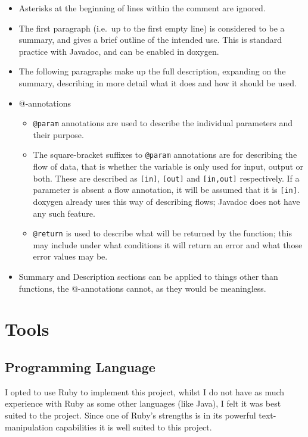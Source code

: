 \begin{itemize}
  \item Asterisks at the beginning of lines within the comment are ignored.
  \item The first paragraph (i.e.~up to the first empty line) is considered to
    be a summary, and gives a brief outline of the intended use. This is
    standard practice with Javadoc, and can be enabled in doxygen.
  \item The following paragraphs make up the full description, expanding on the
    summary, describing in more detail what it does and how it should be used.
  \item @-annotations
    \begin{itemize}
      \item \lstinline|@param| annotations are used to describe the individual
        parameters and their purpose.
      \item The square-bracket suffixes to \lstinline|@param| annotations are
        for describing the flow of data, that is whether the variable is only
        used for input, output or both. These are described as \lstinline|[in]|,
        \lstinline|[out]| and \lstinline|[in,out]| respectively. If a parameter
        is absent a flow annotation, it will be assumed that it is
        \lstinline|[in]|.
        doxygen already uses this way of describing flows; Javadoc does not have
        any such feature.
      \item \lstinline|@return| is used to describe what will be returned by the
        function; this may include under what conditions it will return an error
        and what those error values may be.
    \end{itemize}
    \item Summary and Description sections can be applied to things other than
      functions, the @-annotations cannot, as they would be meaningless.
\end{itemize}

\section{Tools}
  \subsection{Programming Language}
    I opted to use Ruby to implement this project, whilst I do not have as much
    experience with Ruby as some other languages (like Java), I felt it was best
    suited to the project. Since one of Ruby's strengths is in its powerful
    text-manipulation capabilities it is well suited to this project.

